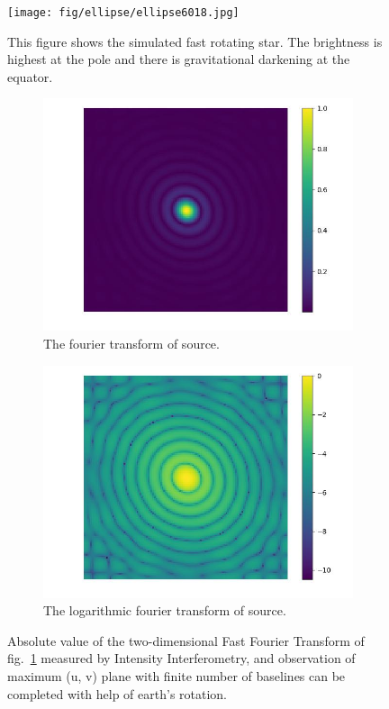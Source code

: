 \begin{figure}
	\centering
	\texttt{[image: fig/ellipse/ellipse6018.jpg]}
	\caption{This figure shows the simulated fast rotating star. The brightness is highest at the pole and there is gravitational darkening at the equator.}
	\label{fig:image}
\end{figure}
\begin{figure}
	\centering
	\begin{subfigure}{0.5\linewidth}
		\includegraphics[width=\linewidth]{fig/ft/ft.jpg}
		\caption{The fourier transform of source.}
	\end{subfigure}\hfill
	\begin{subfigure}{0.5\linewidth}
		\includegraphics[width=\linewidth]{fig/ft/ft_log.jpg}
		\caption{The logarithmic fourier transform of source.}
	\end{subfigure}
	\caption{Absolute value of the two-dimensional Fast Fourier Transform of fig.~\ref{fig:image} measured by Intensity Interferometry, and observation of maximum (u, v) plane with finite number of baselines can be completed with help of earth's rotation.}
	\label{fig:ft}
\end{figure}
